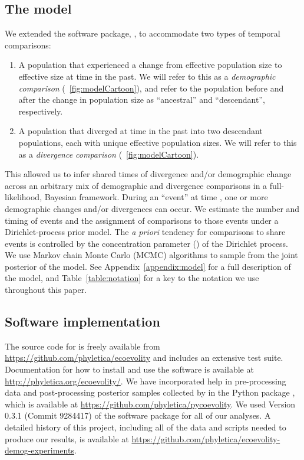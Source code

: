 % 
\subsection{The model}

We extended the software package, \ecoevolity, to accommodate two types of
temporal comparisons:
\begin{enumerate}
    \item A population that experienced a change from effective population size
        \epopsize[\rootpopindex]
        to effective size
        \epopsize[\descendantpopindex{}]
        at time \comparisonetime in the past.
        We will refer to this as a \emph{demographic comparison}
        (\fig{}~\ref{fig:modelCartoon}),
        and refer to the population before and after the change in population
        size as ``ancestral'' and ``descendant'', respectively.
    \item A population that diverged at time \comparisonetime in the past into
        two descendant populations, each with unique effective population
        sizes.
        We will refer to this as a \emph{divergence comparison}
        (\fig{}~\ref{fig:modelCartoon}).
\end{enumerate}
This allowed us to infer shared times of divergence and/or demographic change
across an arbitrary mix of demographic and divergence comparisons in a
full-likelihood, Bayesian framework.
During an ``event'' at time \etime, one or more demographic changes and/or
divergences can occur.
We estimate the number and timing of events and the assignment of comparisons
to those events under a Dirichlet-process \citep{Ferguson1973,Antoniak1974}
prior model.
The \emph{a priori} tendency for comparisons to share events is controlled by
the concentration parameter (\concentration) of the Dirichlet process.
We use Markov chain Monte Carlo (MCMC) algorithms
\citep{Metropolis1953,Hastings1970,Neal2000}
to sample from the joint posterior of the model.
See Appendix~\ref{appendix:model} for a full description of the model, and
Table~\ref{table:notation} for a key to the notation we use throughout this
paper.

\subsection{Software implementation}
The \cpp source code for \ecoevolity is freely available from
\url{https://github.com/phyletica/ecoevolity} and includes an extensive test
suite.
Documentation for how to install and use the software is available at
\url{http://phyletica.org/ecoevolity/}.
We have incorporated help in pre-processing data and post-processing posterior
samples collected by \ecoevolity in the Python package \pycoevolity, which is
available at
\url{https://github.com/phyletica/pycoevolity}.
We used Version 0.3.1
(Commit 9284417)
of the \ecoevolity software package for all of our analyses.
A detailed history of this project, including all of the data and scripts
needed to produce our results, is available at
\url{https://github.com/phyletica/ecoevolity-demog-experiments}.


